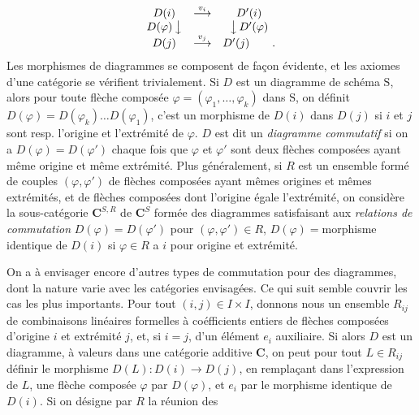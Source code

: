 \[
\begin{array}{ccc}
D(i) & \stackrel{v_i}{\longrightarrow} & D'(i) \\
{D(\varphi)}\,\big\downarrow &&
  \big\downarrow\,{D'(\varphi)} \\
D(j) & \stackrel{v_j}{\longrightarrow} & D'(j)\qquad .
\end{array}
\]
Les morphismes de diagrammes se composent de façon évidente, et les axiomes
d'une catégorie se vérifient trivialement.
Si $D$ est un diagramme de schéma $\mathrm{S}$, alors pour toute flèche composée
$\varphi=(\varphi_1,\ldots,\varphi_k)$ dans $\mathrm{S}$, on définit
$D(\varphi)=D(\varphi_k)\ldots D(\varphi_1)$, c'est un morphisme de $D(i)$
dans $D(j)$ si $i$ et $j$ sont resp. l'origine et l'extrémité de $\varphi$.
$D$ est dit un \textit{diagramme commutatif} si on a
$D(\varphi)=D(\varphi')$ chaque fois que $\varphi$ et $\varphi'$ sont deux
flèches composées ayant même origine et même extrémité.
Plus généralement, si $R$ est un ensemble formé de couples
$(\varphi,\varphi')$ de flèches composées ayant mêmes origines et mêmes
extrémités, et de flèches composées dont l'origine égale l'extrémité, on
considère la sous-catégorie $\mathbf{C}^{S,R}$ de $\mathbf{C}^S$ formée des diagrammes
satisfaisant aux \textit{relations de commutation}
$D(\varphi)=D(\varphi')$ pour $(\varphi,\varphi')\in R$,
$D(\varphi)={}$morphisme identique de $D(i)$ si $\varphi\in R$ a $i$ pour
origine et extrémité.

On a à envisager encore d'autres types de commutation pour des diagrammes,
dont la nature varie avec les catégories envisagées. Ce qui suit semble
couvrir les cas les plus importants. Pour tout $(i,j)\in I\times I$, donnons
nous un ensemble $R_{ij}$ de combinaisons linéaires formelles à coéfficients
entiers de flèches composées d'origine $i$ et extrémité $j$, et, si $i=j$,
d'un élément $e_i$ auxiliaire. Si alors $D$ est un diagramme, à valeurs dans
une catégorie additive $\mathbf{C}$, on peut pour tout $L\in R_{ij}$ définir le
morphisme $D(L):D(i)\to D(j)$, en remplaçant dans l'expression de
$L$, une flèche composée $\varphi$ par $D(\varphi)$, et $e_i$ par le morphisme
identique de $D(i)$. Si on désigne par $R$ la réunion des

